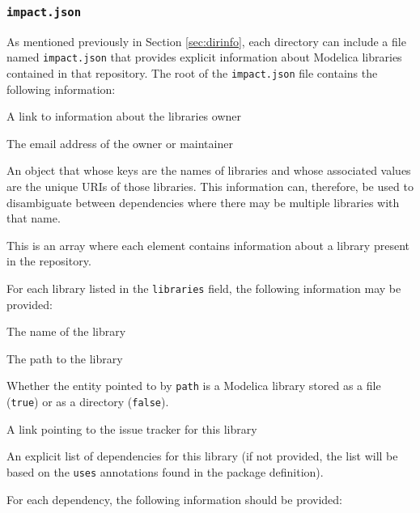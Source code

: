 \documentclass[11pt,a4paper,twocolumn]{article}
\newcommand{\code}[1]{\texttt{#1}} %
\begin{document}
\subsubsection{\code{impact.json}}
\label{sec:dirinfo_schema}

As mentioned previously in Section \ref{sec:dirinfo}, each directory
can include a file named \code{impact.json} that provides explicit
information about Modelica libraries contained in that repository.
The root of the \code{impact.json} file contains the following
information:

\begin{description}[noitemsep]
  \item[\code{owner\_uri}] A link to information about the libraries
    owner
  \item[\code{email}] The email address of the owner or maintainer
  \item[\code{alias}] An object that whose keys are the names of
    libraries and whose associated values are the unique URIs of those
    libraries.  This information can, therefore, be used to
    disambiguate between dependencies where there may be multiple
    libraries with that name.
  \item[\code{libraries}] This is an array where each element contains
    information about a library present in the repository.
\end{description}

For each library listed in the \code{libraries} field, the following
information may be provided:

\begin{description}[noitemsep]
  \item[\code{name}] The name of the library
  \item[\code{path}] The path to the library
  \item[\code{isfile}] Whether the entity pointed to by \code{path} is
    a Modelica library stored as a file (\code{true}) or as a
    directory (\code{false}).
  \item[\code{issues\_url}] A link pointing to the issue tracker for
    this library
  \item[\code{dependencies}] An explicit list of dependencies for this
    library (if not provided, the list will be based on the
    \code{uses} annotations found in the package definition).
\end{description}

For each dependency, the following information should be provided:
\end{document}
